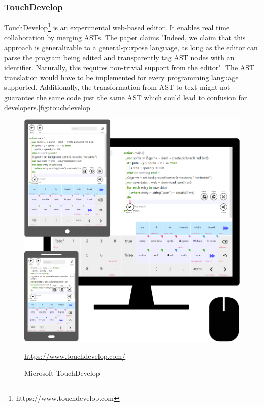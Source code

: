 \subsubsection{TouchDevelop}
TouchDevelop\footnote{https://www.touchdevelop.com} is an experimental web-based editor. It enables real time collaboration by merging ASTs. The paper claims "Indeed, we claim that this approach is generalizable to a
general-purpose language, as long as the editor can parse the
program being edited and transparently tag AST nodes with
an identifier. Naturally, this requires non-trivial support from
the editor". \cite{ProtzenkoBurckhardtMoskalMcClurg:2015:Implementingreal-timecollaborationinTouchDevelopusingASTmerges} The AST translation would have to be implemented for every programming language supported. Additionally, the transformation from AST to text might not guarantee the same code just the same AST which could lead to confusion for developers.\autoref{fig:touchdevelop}
\begin{figure}[hb]
    \centering
    \includegraphics{figures/screenshots/touchdevelop.png}
	\caption{Microsoft TouchDevelop }
	\href{https://www.touchdevelop.com/}{https://www.touchdevelop.com/}
    \label{fig:touchdevelop}
\end{figure}
